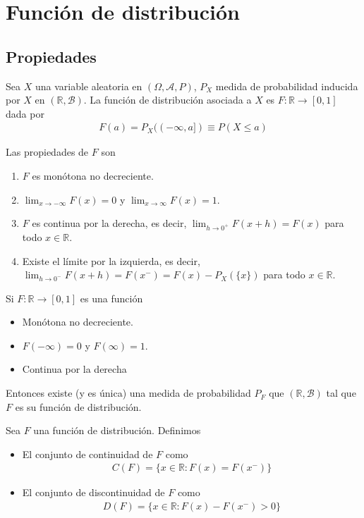 \chapter{Función de distribución}

\section{Propiedades}
\begin{defi}
    Sea $X$ una variable aleatoria en $(\Omega, \mathcal{A}, P)$, $P_X$ medida de probabilidad inducida por $X$ en $(\mathbb{R}, \mathcal{B})$. La función de distribución asociada a $X$ es $F: \mathbb{R} \longrightarrow [0,1]$ dada por
    \begin{align*}
        F(a) = P_X((-\infty,a]) \equiv P(X \leq a)
    \end{align*}
\end{defi}

Las propiedades de $F$ son
\begin{enumerate}
    \item $F$ es monótona no decreciente.
    \item $\lim_{x \to - \infty}F(x) = 0$ y $\lim_{x \to \infty}F(x) = 1$.
    \item $F$ es continua por la derecha, es decir, $\lim_{h \to 0^+}F(x+h) = F(x)$ para todo $x \in \mathbb{R}$.
    \item Existe el límite por la izquierda, es decir, $\lim_{h \to 0^-}F(x+h) = F(x^-) = F(x) - P_X(\{x\})$ para todo $x \in \mathbb{R}$.
\end{enumerate}

\begin{teo}[de correspondencia]
    Si $F: \mathbb{R} \longrightarrow [0,1]$ es una función
    \begin{itemize}
        \item Monótona no decreciente.
        \item $F(-\infty) = 0$ y $F(\infty) = 1$.
        \item Continua por la derecha
    \end{itemize}
    Entonces existe (y es única) una medida de probabilidad $P_F$ que $(\mathbb{R}, \mathcal{B})$ tal que $F$ es su función de distribución.
\end{teo}

\begin{defi}
    Sea $F$ una función de distribución. Definimos
    \begin{itemize}
        \item El conjunto de continuidad de $F$ como
              \begin{align*}
                  C(F) = \{ x \in \mathbb{R} : F(x) = F(x^-)\}
              \end{align*}
        \item El conjunto de discontinuidad de $F$ como
              \begin{align*}
                  D(F) = \{ x \in \mathbb{R} : F(x) - F(x^-) > 0\}
              \end{align*}
    \end{itemize}
\end{defi}

